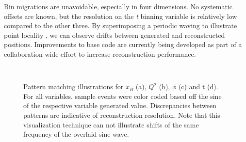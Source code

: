     Bin migrations are unavoidable, especially in four dimensions. No systematic offsets are known, but the resolution on the \textit{t} binning variable is relatively low compared to the other three. By superimposing a periodic waving to illustrate point locality , we can observe drifts between generated and reconstructed positions. Improvements to base code are currently being developed as part of a collaboration-wide effort to increase reconstruction performance. 
    
    \begin{figure}[H]
        \centering
        \hfill
        \\
        \hfill
        \caption[Truth vs. Observed Binning Variable Samples]{Pattern matching illustrations for $x_B$ (a), $Q^2$ (b), $\phi$ (c) and t (d). For all variables, sample events were color coded based off the sine of the respective variable generated value. Discrepancies between patterns are indicative of reconstruction resolution. Note that this visualization technique can not illustrate shifts of the same frequency of the overlaid sine wave.}
        \label{fig:bin_waving}
    \end{figure}
